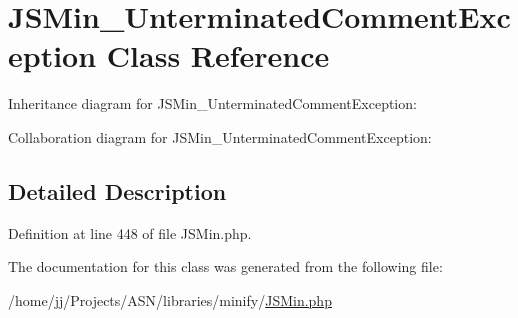 \hypertarget{class_j_s_min___unterminated_comment_exception}{}\section{J\+S\+Min\+\_\+\+Unterminated\+Comment\+Exception Class Reference}
\label{class_j_s_min___unterminated_comment_exception}


Inheritance diagram for J\+S\+Min\+\_\+\+Unterminated\+Comment\+Exception\+:


Collaboration diagram for J\+S\+Min\+\_\+\+Unterminated\+Comment\+Exception\+:


\subsection{Detailed Description}


Definition at line 448 of file J\+S\+Min.\+php.



The documentation for this class was generated from the following file\+:\begin{DoxyCompactItemize}
\item 
/home/jj/\+Projects/\+A\+S\+N/libraries/minify/\hyperlink{_j_s_min_8php}{J\+S\+Min.\+php}\end{DoxyCompactItemize}
